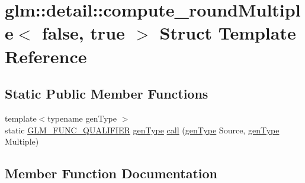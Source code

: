 \hypertarget{structglm_1_1detail_1_1compute__round_multiple_3_01false_00_01true_01_4}{}\section{glm\+:\+:detail\+:\+:compute\+\_\+round\+Multiple$<$ false, true $>$ Struct Template Reference}
\label{structglm_1_1detail_1_1compute__round_multiple_3_01false_00_01true_01_4}
\subsection*{Static Public Member Functions}
\begin{DoxyCompactItemize}
\item 
{\footnotesize template$<$typename gen\+Type $>$ }\\static \hyperlink{setup_8hpp_a33fdea6f91c5f834105f7415e2a64407}{G\+L\+M\+\_\+\+F\+U\+N\+C\+\_\+\+Q\+U\+A\+L\+I\+F\+I\+ER} \hyperlink{structglm_1_1detail_1_1gen_type}{gen\+Type} \hyperlink{structglm_1_1detail_1_1compute__round_multiple_3_01false_00_01true_01_4_a9f9791732bf5427c856feac9fed810da}{call} (\hyperlink{structglm_1_1detail_1_1gen_type}{gen\+Type} Source, \hyperlink{structglm_1_1detail_1_1gen_type}{gen\+Type} Multiple)
\end{DoxyCompactItemize}


\subsection{Member Function Documentation}
\mbox{\label{structglm_1_1detail_1_1compute__round_multiple_3_01false_00_01true_01_4_a9f9791732bf5427c856feac9fed810da}} 
